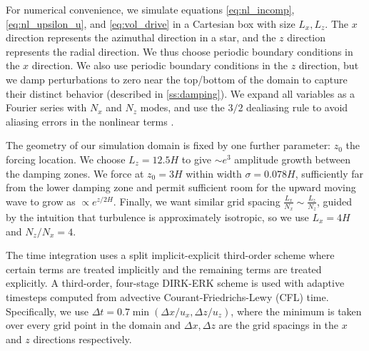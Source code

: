 \documentclass[
        fleqn,
        usenatbib,
    ]{mnras}
\begin{document}
For numerical convenience, we simulate equations \autoref{eq:nl_incomp},
\autoref{eq:nl_upsilon_u}, and \autoref{eq:vol_drive} in a Cartesian box with
size $L_x, L_z$. The $x$ direction represents the azimuthal direction in a star,
and the $z$ direction represents the radial direction. We thus choose periodic
boundary conditions in the $x$ direction. We also use periodic boundary
conditions in the $z$ direction, but we damp perturbations to zero near the
top/bottom of the domain to capture their distinct behavior (described in
\autoref{ss:damping}). We expand all variables as a Fourier series with $N_x$
and $N_z$ modes, and use the $3/2$ dealiasing rule to avoid aliasing errors in
the nonlinear terms \citep{boyd}.

The geometry of our simulation domain is fixed by one further parameter: $z_0$
the forcing location. We choose $L_z = 12.5H$ to give $\sim e^3$ amplitude growth
between the damping zones. We force at $z_0 = 3H$ within width $\sigma =
0.078H$, sufficiently far from the lower damping zone and permit sufficient room
for the upward moving wave to grow as $\propto e^{z/2H}$. Finally, we want
similar grid spacing $\frac{L_x}{N_x} \sim \frac{L_z}{N_z}$, guided by the
intuition that turbulence is approximately isotropic, so we use $L_x = 4H$ and
$N_z / N_x = 4$.

The time integration uses a split implicit-explicit third-order scheme where
certain terms are treated implicitly and the remaining terms are treated
explicitly. A third-order, four-stage DIRK-ERK scheme \citep{ascher} is used
with adaptive timesteps computed from advective Courant-Friedrichs-Lewy (CFL)
time. Specifically, we use $\Delta t = 0.7 \min(\Delta x / u_x,\Delta z /
u_{z})$, where the minimum is taken over every grid point in the domain and
$\Delta x,\Delta z$ are the grid spacings in the $x$ and $z$ directions
respectively.
\end{document}
